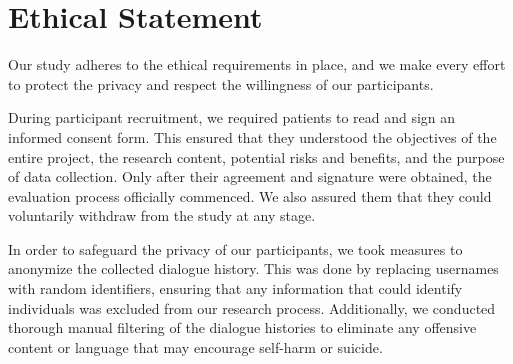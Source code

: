 \section{Ethical Statement}
\label{sec:ethics}

Our study adheres to the ethical requirements in place, and we make every effort to protect the privacy and respect the willingness of our participants.

During participant recruitment, we required patients to read and sign an informed consent form. This ensured that they understood the objectives of the entire project, the research content, potential risks and benefits, and the purpose of data collection. Only after their agreement and signature were obtained, the evaluation process officially commenced. We also assured them that they could voluntarily withdraw from the study at any stage.

In order to safeguard the privacy of our participants, we took measures to anonymize the collected dialogue history. This was done by replacing usernames with random identifiers, ensuring that any information that could identify individuals was excluded from our research process. Additionally, we conducted thorough manual filtering of the dialogue histories to eliminate any offensive content or language that may encourage self-harm or suicide.


